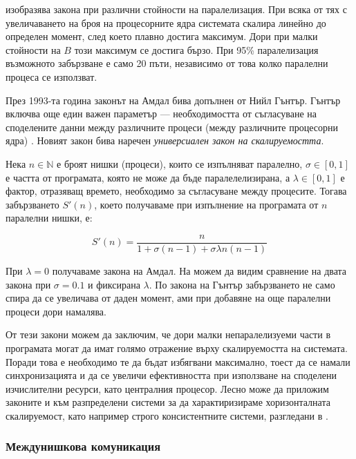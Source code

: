  изобразява закона при различни стойности на паралелизация. При всяка от тях с увеличаването на броя на процесорните ядра системата скалира линейно до определен момент, след което плавно достига максимум. Дори при малки стойности на $B$ този максимум се достига бързо. При 95\% паралелизация възможното забързване е само 20 пъти, независимо от това колко паралелни процеса се използват.

През 1993-та година законът на Амдал бива допълнен от Нийл Гънтър. Гънтър включва още един важен параметър — необходимостта от съгласуване на споделените данни между различните процеси (между различните процесорни ядра) \cite{gunther1993Law}. Новият закон бива наречен \emph{универсиален закон на скалируемостта}.

Нека $n \in \mathbb{N}$ е броят нишки (процеси), които се изпълняват паралелно, $\sigma \in [0, 1]$ е частта от програмата, която не може да бъде паралелелизирана, а $\lambda \in [0, 1]$ е фактор, отразяващ времето, необходимо за съгласуване между процесите. Тогава забързването $S'(n)$, което получаваме при изпълнение на програмата от $n$ паралелни нишки, е:

\begin{equation}
S'(n) = \frac{n}{1 + \sigma(n - 1) + \sigma\lambda{n}(n - 1)}
\end{equation}

При $\lambda = 0$ получаваме закона на Амдал. На  можем да видим сравнение на двата закона при $\sigma = 0.1$ и фиксирана $\lambda$. По закона на Гънтър забързването не само спира да се увеличава от даден момент, ами при добавяне на още паралелни процеси дори намалява.

От тези закони можем да заключим, че дори малки непаралелизуеми части в програмата могат да имат голямо отражение върху скалируемостта на системата. Поради това е необходимо те да бъдат избягвани максимално, тоест да се намали синхронизацията и да се увеличи ефективността при използване на споделени изчислителни ресурси, като централния процесор. Лесно може да приложим законите и към разпределени системи за да характиризираме хоризонталната скалируемост, като например строго консистентните системи, разгледани в .

\subsubsection{Междунишкова комуникация}

